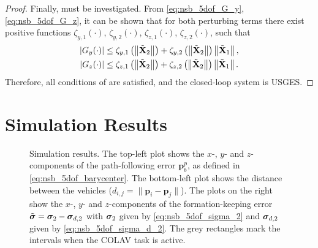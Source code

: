 \begin{proof}
Finally, \cite[Assumption 2]{pettersen_lyapunov_2017} must be investigated.
From \eqref{eq:nsb_5dof_G_y}, \eqref{eq:nsb_5dof_G_z}, it can be shown that for both perturbing terms there exist positive functions $\zeta_{y,1}(\cdot)$, $\zeta_{y,2}(\cdot)$, $\zeta_{z,1}(\cdot)$, $\zeta_{z,2}(\cdot)$, such that
\begin{align}
    \left|G_y(\cdot)\right| &\leq \zeta_{y,1}\left(\left\|\tilde{\mathbf{X}}_2\right\|\right) + \zeta_{y,2}\left(\left\|\tilde{\mathbf{X}}_2\right\|\right)\left\|\tilde{\mathbf{X}}_1\right\|, \\
    \left|G_z(\cdot)\right| &\leq \zeta_{z,1}\left(\left\|\tilde{\mathbf{X}}_2\right\|\right) + \zeta_{z,2}\left(\left\|\tilde{\mathbf{X}}_2\right\|\right)\left\|\tilde{\mathbf{X}}_1\right\|.
\end{align}
Therefore, all conditions of \cite[Proposition 9]{pettersen_lyapunov_2017} are satisfied, and the closed-loop system is USGES.    
\end{proof}

\section{Simulation Results}
\label{sec:nsb_5dof_simulations}

\begin{figure}[t]
    \centering
    
    \vspace{-1.5mm}
    \caption{Simulation results. The top-left plot shows the $x$-, $y$- and $z$-components of the path-following error $\mathbf{p}_b^p$, as defined in \eqref{eq:nsb_5dof_barycenter}. The bottom-left plot shows the distance between the vehicles ($d_{i,j} = \|\mathbf{p}_i - \mathbf{p}_j\|$). The plots on the right show the $x$-, $y$- and $z$-components of the formation-keeping error $\tilde{\bm{\sigma}} = \bm{\sigma}_2 - \bm{\sigma}_{d,2}$ with $\bm{\sigma}_2$ given by \eqref{eq:nsb_5dof_sigma_2} and $\bm{\sigma}_{d,2}$ given by \eqref{eq:nsb_5dof_sigma_d_2}. The grey rectangles mark the intervals when the COLAV task is active.}
    \label{fig:nsb_5dof_results}
    \vspace{-5mm}
\end{figure}

